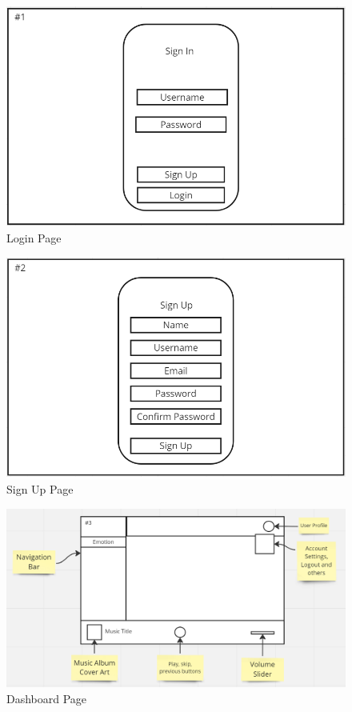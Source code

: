 \newpage

\setcounter{figure}{0}
\setcounter{table}{0}
\begin{figure}[H]
    \centering
    \includegraphics[width=12cm]{Images/login.png}
    \caption{Login Page}
    \label{fig:login}
\end{figure}
\begin{figure}[H]
    \centering
    \includegraphics[width=12cm]{Images/signup.png}
    \caption{Sign Up Page}
    \label{fig:signup}
\end{figure}
\begin{figure}[H]
    \centering
    \includegraphics[width=12cm]{Images/overview.png}
    \caption{Dashboard Page}
    \label{fig:dashboard}
\end{figure}
